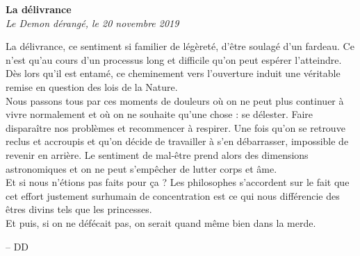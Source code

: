 \documentclass[french,12pt,amstex,a4paper]{article}
\begin{document}
\begin{center}
{\bf La délivrance}\\
{\it Le Demon dérangé, le 20 novembre 2019}\\
\end{center}

La délivrance, ce sentiment si familier de légèreté, d'être soulagé d'un fardeau. Ce n'est qu'au cours d'un processus long et difficile qu'on peut espérer l'atteindre. Dès lors qu'il est entamé, ce cheminement vers l'ouverture induit une véritable remise en question des lois de la Nature.\\

Nous passons tous par ces moments de douleurs où on ne peut plus continuer à vivre normalement et où on ne souhaite qu'une chose : se délester. Faire disparaître nos problèmes et recommencer à respirer. Une fois qu'on se retrouve reclus et accroupis et qu'on décide de travailler à s'en débarrasser, impossible de revenir en arrière. Le sentiment de mal-être prend alors des dimensions astronomiques et on ne peut s'empêcher de lutter corps et âme.\\

Et si nous n'étions pas faits pour ça ? Les philosophes s'accordent sur le fait que cet effort justement surhumain de concentration est ce qui nous différencie des êtres divins tels que les princesses.\\

Et puis, si on ne défécait pas, on serait quand même bien dans la merde.

\begin{flushright}
-- DD
\end{flushright}
\end{document}
